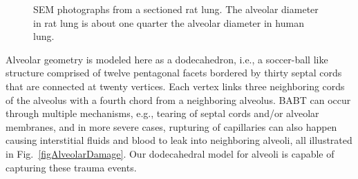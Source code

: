 \begin{figure}
    \centering
    \hfill
    \caption{SEM photographs from a sectioned rat lung.  The alveolar diameter in rat lung is about one quarter the alveolar diameter in human lung.}
    \label{figRatLung}
\end{figure}

Alveolar geometry is modeled here as a dodecahedron, i.e., a soccer-ball like structure comprised of twelve pentagonal facets bordered by thirty septal cords that are connected at twenty vertices.  Each vertex links three neighboring cords of the alveolus with a fourth chord from a neighboring alveolus.  BABT can occur through multiple mechanisms, e.g., tearing of septal cords and\slash or alveolar membranes, and in more severe cases, rupturing of capillaries can also happen causing interstitial fluids and blood to leak into neighboring alveoli, all illustrated in Fig.~\ref{figAlveolarDamage}.  Our dodecahedral model for alveoli is capable of capturing these trauma events.

